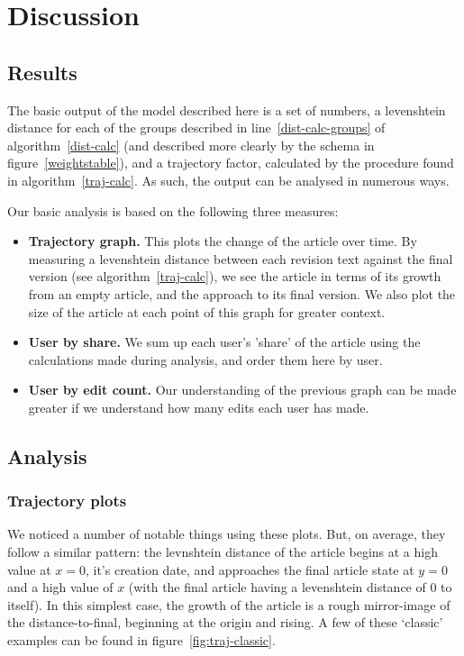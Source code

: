 \chapter {Discussion}

\section{Results}
The basic output of the model described here is a set of numbers, a
levenshtein distance for each of the groups described in
line~\ref{dist-calc-groups} of algorithm~\ref{dist-calc} (and
described more clearly by the schema in figure~\ref{weightstable}),
and a trajectory factor, calculated by the procedure found in
algorithm~\ref{traj-calc}. As such, the output can be analysed in
numerous ways.

Our basic analysis is based on the following three measures:
\begin{itemize}[]
\item \textbf{Trajectory graph.} This plots the change of the article
  over time. By measuring a levenshtein distance between each revision
  text against the final version (see algorithm~\ref{traj-calc}), we
  see the article in terms of its growth from an empty article, and
  the approach to its final version. We also plot the size of the
  article at each point of this graph for greater context.
\item \textbf{User by share.} We sum up each user's 'share' of the
  article using the calculations made during analysis, and order them
  here by user.
\item \textbf{User by edit count.} Our understanding of the previous
  graph can be made greater if we understand how many edits each user
  has made.
\end{itemize}

\section{Analysis}
\subsection*{Trajectory plots}
We noticed a number of notable things using these plots. But, on
average, they follow a similar pattern: the levnshtein distance of the
article begins at a high value at $x=0$, it's creation date, and
approaches the final article state at $y=0$ and a high value of $x$
(with the final article having a levenshtein distance of $0$ to
itself). In this simplest case, the growth of the article is a rough
mirror-image of the distance-to-final, beginning at the origin and
rising. A few of these `classic' examples can be found in
figure~\ref{fig:traj-classic}.

